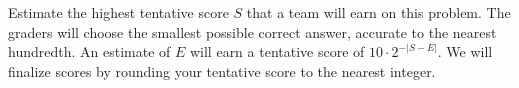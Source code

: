 Estimate the highest tentative score $S$ that a team will earn on this problem. The graders will choose the smallest possible correct answer, accurate to the nearest hundredth. An estimate of $E$ will earn a tentative score of $10 \cdot 2^{-|S-E|}$. We will finalize scores by rounding your tentative score to the nearest integer.
